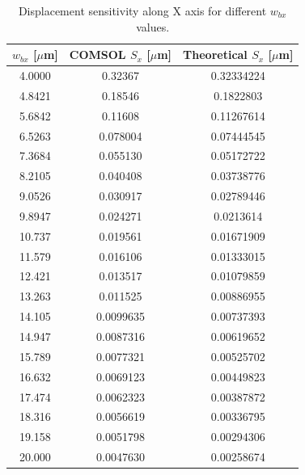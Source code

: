 \documentclass[lettersize,journal]{IEEEtran}
\begin{document}
    \begin{table}[h]
        \caption{Displacement sensitivity along X axis for different \(w_{bx}\) values.}
        \renewcommand{\arraystretch}{1.2}
        \centering
        \begin{tabular}{|c|c|c|}
            \hline
            \textbf{\(w_{bx}\) [\(\mu\)m]} & \textbf{COMSOL \(S_x\) [\(\mu\)m]} & \textbf{Theoretical \(S_x\) [\(\mu\)m]}\\ \hline
            4.0000       & 0.32367      & 0.32334224                 \\ \hline
            4.8421       & 0.18546     & 0.1822803                  \\ \hline
            5.6842       & 0.11608     & 0.11267614                 \\ \hline
            6.5263       & 0.078004     & 0.07444545                 \\ \hline
            7.3684       & 0.055130     & 0.05172722                 \\ \hline
            8.2105       & 0.040408     & 0.03738776                \\ \hline
            9.0526       & 0.030917     & 0.02789446                   \\ \hline
            9.8947       & 0.024271     & 0.0213614                 \\ \hline
            10.737       & 0.019561     & 0.01671909                 \\ \hline
            11.579       & 0.016106     & 0.01333015                 \\ \hline
            12.421       & 0.013517     & 0.01079859                \\ \hline
            13.263       & 0.011525     & 0.00886955                \\ \hline
            14.105       & 0.0099635     & 0.00737393                 \\ \hline
            14.947       & 0.0087316     & 0.00619652                 \\ \hline
            15.789       & 0.0077321     & 0.00525702                \\ \hline
            16.632       & 0.0069123     & 0.00449823                \\ \hline
            17.474       & 0.0062323     & 0.00387872               \\ \hline
            18.316       & 0.0056619     & 0.00336795               \\ \hline
            19.158       & 0.0051798     & 0.00294306               \\ \hline
            20.000       & 0.0047630     & 0.00258674               \\ \hline
        \end{tabular}
        \label{tab:wbx_sweep}
    \end{table}
    
\end{document}
